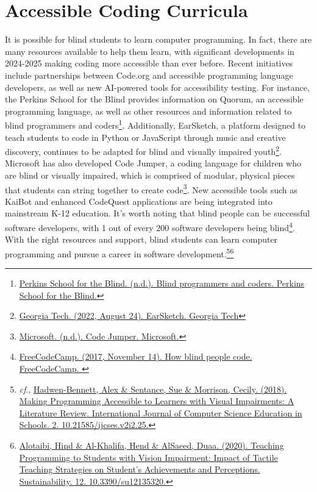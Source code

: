 \begin{itemize}
\begin{itemize}
\hypertarget{appx8}{}\section[Accessible Coding Curricula]{Accessible Coding Curricula}\label{appx8}
It is possible for blind students to learn computer programming. In fact, there are many resources available to help them learn, with significant developments in 2024-2025 making coding more accessible than ever before. Recent initiatives include partnerships between Code.org and accessible programming language developers, as well as new AI-powered tools for accessibility testing. For instance, the Perkins School for the Blind provides information on Quorum, an accessible programming language, as well as other resources and information related to blind programmers and coders\footnote{\raggedright \href{https://www.perkins.org/stories/blind-programmers-and-coders}{Perkins School for the Blind. (n.d.). Blind programmers and coders. Perkins School for the Blind.}}. Additionally, EarSketch, a platform designed to teach students to code in Python or JavaScript through music and creative discovery, continues to be adapted for blind and visually impaired youth\footnote{\raggedright \href{https://earsketch.gatech.edu/}{Georgia Tech. (2022, August 24). EarSketch. Georgia Tech}}. Microsoft has also developed Code Jumper, a coding language for children who are blind or visually impaired, which is comprised of modular, physical pieces that students can string together to create code\footnote{\raggedright \href{https://www.microsoft.com/en-us/research/project/code-jumper/}{Microsoft. (n.d.). Code Jumper. Microsoft.} }. New accessible tools such as KaiBot and enhanced CodeQuest applications are being integrated into mainstream K-12 education. It's worth noting that blind people can be successful software developers, with 1 out of every 200 software developers being blind\footnote{\raggedright \href{https://www.freecodecamp.org/news/how-blind-people-code-fdb64e3bf5c/}{FreeCodeCamp. (2017, November 14). How blind people code. FreeCodeCamp. }}. With the right resources and support, blind students can learn computer programming and pursue a career in software development.\footnote{\raggedright \emph{cf}., \href{https://files.eric.ed.gov/fulltext/EJ1207407.pdf}{Hadwen-Bennett, Alex \& Sentance, Sue \& Morrison, Cecily. (2018). Making Programming Accessible to Learners with Visual Impairments: A Literature Review. International Journal of Computer Science Education in Schools. 2. 10.21585/ijcses.v2i2.25.}}\footnote{\raggedright \href{https://www.mdpi.com/2071-1050/12/13/5320}{Alotaibi, Hind \& Al-Khalifa, Hend \& AlSaeed, Duaa. (2020). Teaching Programming to Students with Vision Impairment: Impact of Tactile Teaching Strategies on Student's Achievements and Perceptions. Sustainability. 12. 10.3390/su12135320.}}


\end{itemize}
\end{itemize}
